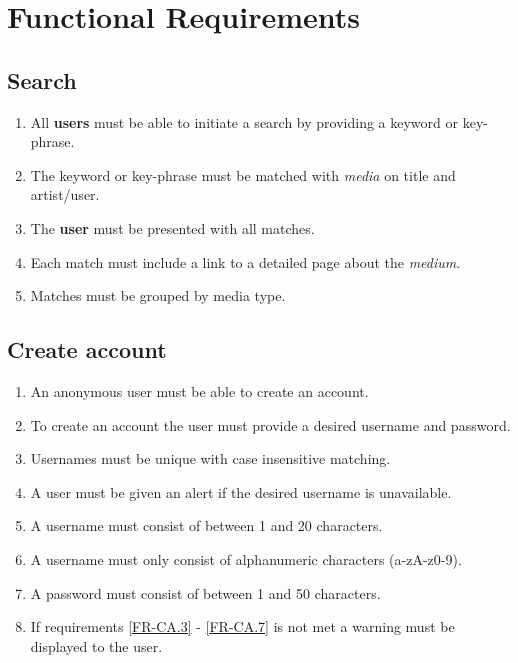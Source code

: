 \documentclass[../report.tex]{subfiles}
\begin{document}
\section{Functional Requirements}

\subsection {Search}

\begin{enumerate}[label=FR-\twodigits*]

	\item All \textbf{users} must be able to initiate a search by providing a keyword or key-phrase.
	\item The keyword or key-phrase must be matched with \textit{media} on title and artist/user.
	\item The \textbf{user} must be presented with all matches.
	\item Each match must include a link to a detailed page about the \textit{medium}.
	\item Matches must be grouped by media type. 
\end{enumerate}	
			
\subsection{Create account}

\begin{enumerate}[label=FR-\twodigits*, resume]
	\item An anonymous user must be able to create an account.
	\item To create an account the user must provide a desired username and password.
	\item Usernames must be unique with case insensitive matching. \label{FR-CA.3}
	\item A user must be given an alert if the desired username is unavailable.
	\item A username must consist of between 1 and 20 characters.
	\item A username must only consist of alphanumeric characters (a-zA-z0-9).
	\item A password must consist of between 1 and 50 characters. \label{FR-CA.7}
	\item If requirements \ref{FR-CA.3} - \ref{FR-CA.7} is not met a warning must be displayed to the user.
\end{enumerate}
	
\end{document}
